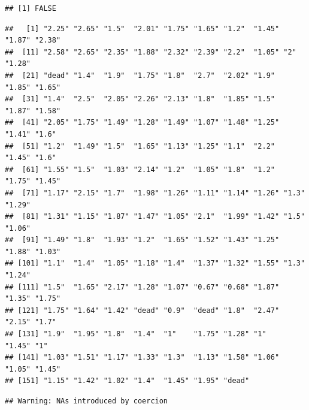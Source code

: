 \documentclass[
]{article}
\newenvironment{Shaded}{\begin{snugshade}}{\end{snugshade}}
\newcommand{\FunctionTok}[1]{\textcolor[rgb]{0.00,0.00,0.00}{#1}}
\newcommand{\NormalTok}[1]{#1}
\newcommand{\SpecialCharTok}[1]{\textcolor[rgb]{0.00,0.00,0.00}{#1}}
\begin{document}
\begin{verbatim}
## [1] FALSE
\end{verbatim}

\begin{Shaded}
\end{Shaded}

\begin{verbatim}
##   [1] "2.25" "2.65" "1.5"  "2.01" "1.75" "1.65" "1.2"  "1.45" "1.87" "2.38"
##  [11] "2.58" "2.65" "2.35" "1.88" "2.32" "2.39" "2.2"  "1.05" "2"    "1.28"
##  [21] "dead" "1.4"  "1.9"  "1.75" "1.8"  "2.7"  "2.02" "1.9"  "1.85" "1.65"
##  [31] "1.4"  "2.5"  "2.05" "2.26" "2.13" "1.8"  "1.85" "1.5"  "1.87" "1.58"
##  [41] "2.05" "1.75" "1.49" "1.28" "1.49" "1.07" "1.48" "1.25" "1.41" "1.6" 
##  [51] "1.2"  "1.49" "1.5"  "1.65" "1.13" "1.25" "1.1"  "2.2"  "1.45" "1.6" 
##  [61] "1.55" "1.5"  "1.03" "2.14" "1.2"  "1.05" "1.8"  "1.2"  "1.75" "1.45"
##  [71] "1.17" "2.15" "1.7"  "1.98" "1.26" "1.11" "1.14" "1.26" "1.3"  "1.29"
##  [81] "1.31" "1.15" "1.87" "1.47" "1.05" "2.1"  "1.99" "1.42" "1.5"  "1.06"
##  [91] "1.49" "1.8"  "1.93" "1.2"  "1.65" "1.52" "1.43" "1.25" "1.88" "1.03"
## [101] "1.1"  "1.4"  "1.05" "1.18" "1.4"  "1.37" "1.32" "1.55" "1.3"  "1.24"
## [111] "1.5"  "1.65" "2.17" "1.28" "1.07" "0.67" "0.68" "1.87" "1.35" "1.75"
## [121] "1.75" "1.64" "1.42" "dead" "0.9"  "dead" "1.8"  "2.47" "2.15" "1.7" 
## [131] "1.9"  "1.95" "1.8"  "1.4"  "1"    "1.75" "1.28" "1"    "1.45" "1"   
## [141] "1.03" "1.51" "1.17" "1.33" "1.3"  "1.13" "1.58" "1.06" "1.05" "1.45"
## [151] "1.15" "1.42" "1.02" "1.4"  "1.45" "1.95" "dead"
\end{verbatim}

\begin{Shaded}
\end{Shaded}

\begin{verbatim}
## Warning: NAs introduced by coercion
\end{verbatim}
\end{document}
